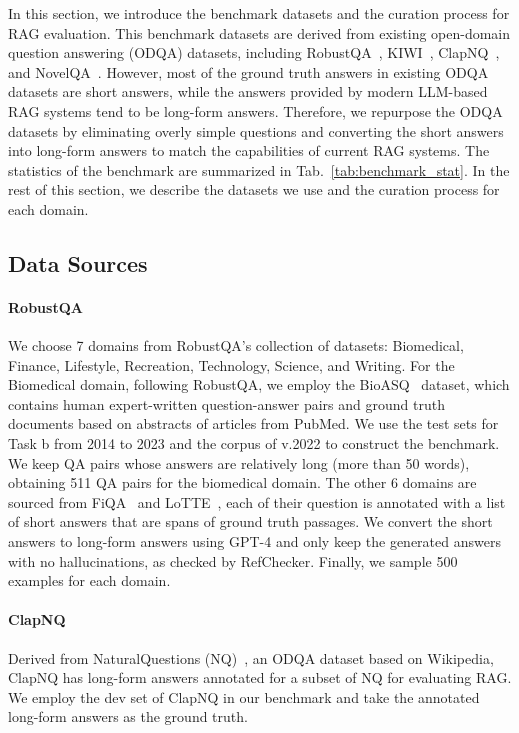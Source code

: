 In this section, we introduce the benchmark datasets and the curation process for RAG evaluation. This benchmark datasets are derived from existing open-domain question answering (ODQA) datasets, including RobustQA~\cite{Han2023}, KIWI~\cite{xu2024kiwi}, ClapNQ~\cite{rosenthal2024clapnq}, and NovelQA~\cite{wang2024novelqa}. However, most of the ground truth answers in existing ODQA datasets are short answers, while the answers provided by modern LLM-based RAG systems tend to be long-form answers. Therefore, we repurpose the ODQA datasets by eliminating overly simple questions and converting the short answers into long-form answers to match the capabilities of current RAG systems. The statistics of the benchmark are summarized in Tab.~\ref{tab:benchmark_stat}. In the rest of this section, we describe the datasets we use and the curation process for each domain.


\subsection{Data Sources}

\paragraph{RobustQA}
We choose 7 domains from RobustQA's collection of datasets: Biomedical, Finance, Lifestyle, Recreation, Technology, Science, and Writing. For the Biomedical domain, following RobustQA, we employ the BioASQ~\cite{tsatsaronis2015overview} dataset, which contains human expert-written question-answer pairs and ground truth documents based on abstracts of articles from PubMed. We use the test sets for Task b from 2014 to 2023 and the corpus of v.2022 to construct the benchmark. We keep QA pairs whose answers are relatively long (more than 50 words), obtaining 511 QA pairs for the biomedical domain. The other 6 domains are sourced from FiQA~\cite{maia201818} and LoTTE~\cite{santhanam-etal-2022-colbertv2}, each of their question is annotated with a list of short answers that are spans of ground truth passages. We convert the short answers to long-form answers using GPT-4 and only keep the generated answers with no hallucinations, as checked by RefChecker. Finally, we sample 500 examples for each domain.


\paragraph{ClapNQ}
Derived from NaturalQuestions (NQ)~\cite{kwiatkowski-etal-2019-natural}, an ODQA dataset based on Wikipedia, ClapNQ has long-form answers annotated for a subset of NQ for evaluating RAG. We employ the dev set of ClapNQ in our benchmark and take the annotated long-form answers as the ground truth.


